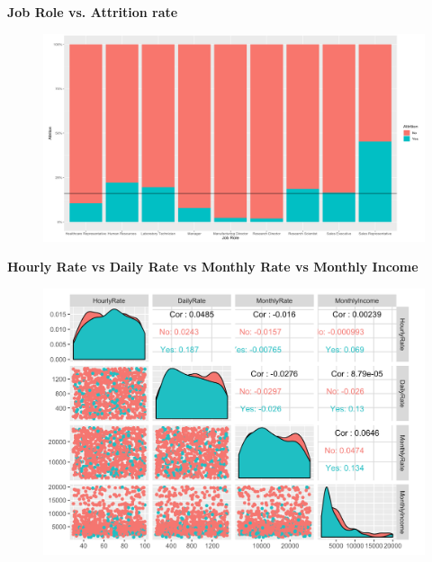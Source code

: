 \documentclass[notes,11pt]{beamer}
\begin{document}
\begin{frame}
\begin{center}
\textbf{\color{blue}\Large{Job Role vs. Attrition rate}}
\end{center}\medskip
\begin{figure}
\includegraphics[scale=0.25]{PIC4}
\end{figure}


\end{frame}


\begin{frame}
\begin{center}
\textbf{\color{blue}\Large{Hourly Rate vs Daily Rate vs Monthly Rate vs Monthly Income}}
\end{center}\medskip
\begin{figure}
\includegraphics[scale=0.40]{PIC6}
\end{figure}


\end{frame}
\end{document}
